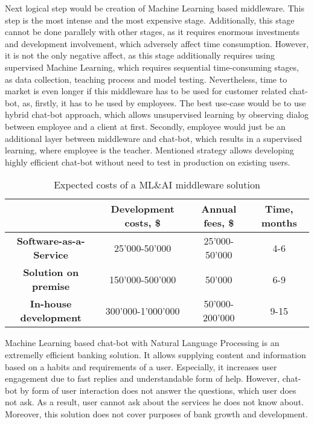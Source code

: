 Next logical step would be creation of Machine Learning based middleware.
This step is the most intense and the most expensive stage.
Additionally, this stage cannot be done parallely with other stages, as it requires enormous investments and development involvement, which adversely affect time consumption.
However, it is not the only negative affect, as this stage additionally requires using supervised Machine Learning, which requires sequential time-consuming stages, as data collection, teaching process and model testing.
Nevertheless, time to market is even longer if this middleware has to be used for customer related chat-bot, as, firstly, it has to be used by employees.
The best use-case would be to use hybrid chat-bot approach, which allows unsupervised learning by observing dialog between employee and a client at first.
Secondly, employee would just be an additional layer between middleware and chat-bot, which results in a supervised learning, where employee is the teacher.
Mentioned strategy allows developing highly efficient chat-bot without need to test in production on existing users.

\begin{table}
    \centering
    \caption{Expected costs of a ML\&AI middleware solution}
    \begin{tabular}{| c | c | c | c |}
        \hline
        &
        \textbf{Development costs, \$} & 
        \textbf{Annual fees, \$} &
        \textbf{Time, months} \\ \hline 
       
        \textbf{Software-as-a-Service} & 
            25'000-50'000 & 
            25'000-50'000 &
            4-6 \\ \hline 
       
        \textbf{Solution on premise} & 
            150'000-500'000 &
            50'000 &
            6-9 \\ \hline 
            
        \textbf{In-house development} &
            300'000-1'000'000 &
            50'000-200'000 &
            9-15 \\ \hline
    \end{tabular}
    \medskip
\end{table}

Machine Learning based chat-bot with Natural Language Processing is an extremelly efficient banking solution.
It allows supplying content and information based on a habits and requirements of a user.
Especially, it increases user engagement due to fast replies and understandable form of help.
However, chat-bot by form of user interaction does not answer the questions, which user does not ask.
As a result, user cannot ask about the services he does not know about.
Moreover, this solution does not cover purposes of bank growth and development.

